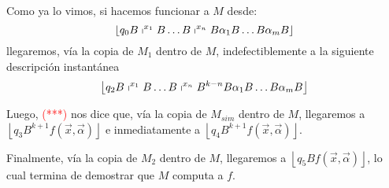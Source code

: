 \begin{frame}
  \begin{block}{}
    \PN Como ya lo vimos, si hacemos funcionar a $M$ desde:
    \begin{equation*}
      \left\lfloor q_{0} B \shortmid^{x_{1}} B \dotsc B \shortmid^{x_{n}} B \alpha_{1} B \dotsc B \alpha_{m} B
      \right\rfloor
    \end{equation*}
    \PN llegaremos, vía la copia de $M_{1}$ dentro de $M$, indefectiblemente a la siguiente descripción instantánea
    \begin{equation*}
      \left\lfloor q_{2} B \shortmid^{x_{1}} B \dotsc B \shortmid^{x_{n}} B^{k-n}B \alpha_{1} B \dotsc B \alpha_{m} B
      \right\rfloor
    \end{equation*}

    \PN Luego, \textcolor{red}{(***)} nos dice que, vía la copia de $M_{sim}$ dentro de $M$, llegaremos a $\left\lfloor
    q_{3} B^{k+1} f(\vec{x},\vec{\alpha}) \right\rfloor$ e inmediatamente a $\left\lfloor q_{4} B^{k+1} f(\vec{x},
    \vec{\alpha}) \right\rfloor$.

    \vspace{3mm}
    \PN Finalmente, vía la copia de $M_{2}$ dentro de $M$, llegaremos a $\left\lfloor q_{5} B f(\vec{x},\vec{\alpha})
    \right\rfloor$, lo cual termina de demostrar que $M$ computa a $f$.
  \end{block}
\end{frame}
